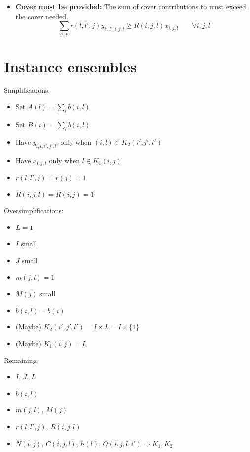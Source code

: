 \documentclass{article}
\begin{document}
\begin{itemize}
\item
\textbf{Cover must be provided:}
The sum of cover contributions to must exceed the cover needed.
\begin{equation} \label{eqn:constraint_cover}
    \sum_{i', l'} r(l, l', j) y_{i', l', i, j, l} \geq R(i, j, l) x_{i, j, l} \qquad \forall i, j, l
\end{equation}
\end{itemize}

\section{Instance ensembles}
Simplifications:
\begin{itemize}
    \item Set $A(l) = \sum_{i} b(i, l)$
    \item Set $B(i) = \sum_{l} b(i, l)$
    \item Have $y_{i,l,i',j',l'}$ only when $(i, l) \in K_2(i', j', l')$
    \item Have $x_{i, j, l}$ only when $l \in K_1(i, j)$
    \item $r(l, l', j) = r(j) = 1$
    \item $R(i, j, l) = R(i, j) = 1$
\end{itemize}

\noindent
Oversimplifications:
\begin{itemize}
\item $L = 1$
\item $I$ small
\item $J$ small
\item $m(j, l) = 1$
\item $M(j)$ small 
\item $b(i, l) = b(i)$
\item (Maybe) $K_2(i', j', l') = I \times L = I \times \{1\}$
\item (Maybe) $K_1(i, j) = L$
\end{itemize}

\noindent
Remaining:
\begin{itemize}
\item $I$, $J$, $L$
\item $b(i, l)$
\item $m(j, l)$, $M(j)$
\item $r(l, l', j)$, $R(i, j, l)$
\item $N(i, j)$, $C(i, j, l)$, $h(l)$, $Q(i, j, l, i') \Rightarrow K_1, K_2$
\end{itemize}
\end{document}
